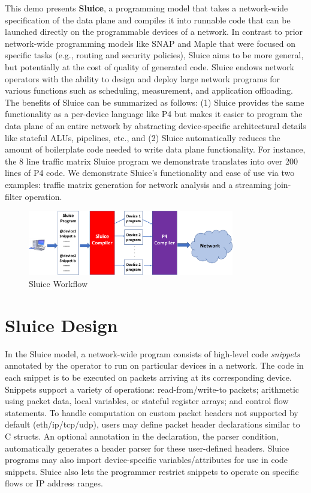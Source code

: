 This demo presents \textbf{Sluice}, a programming model that takes a
network-wide specification of the data plane and compiles it into runnable code
that can be launched directly on the programmable devices of a network. In
contrast to prior network-wide programming models like SNAP and Maple that were
focused on specific tasks (e.g., routing and security policies), Sluice aims to
be more general, but potentially at the cost of quality of generated code.
Sluice endows network operators with the ability to design and deploy large
network programs for various functions such as scheduling, measurement, and
application offloading.  The benefits of Sluice can be summarized as follows: (1) Sluice provides the same functionality as a per-device language like P4 but makes it easier to program the data plane of an entire network by abstracting device-specific architectural details like stateful ALUs, pipelines, etc., and (2) Sluice automatically reduces the amount of boilerplate code needed to write data plane functionality. For instance, the 8 line traffic matrix Sluice program we demonstrate translates into over 200 lines of P4 code. We demonstrate Sluice's functionality and ease of use via two examples: traffic matrix generation for network analysis and a streaming join-filter operation.
\begin{figure}[tp]
\centering
\includegraphics[width=90mm,scale=0.7]{figures/sluice_workflow.pdf}
\caption{Sluice Workflow}
\vspace{-7mm}
\end{figure}
\vspace{-3mm}

\section{Sluice Design}
In the Sluice model, a network-wide program consists of high-level code
\textit{snippets} annotated by the operator to run on particular devices in a
network. The code in each snippet is to be executed on packets arriving at its
corresponding device. Snippets support a variety of operations:
read-from/write-to packets; arithmetic using packet data, local variables, or
stateful register arrays; and control flow statements. To handle computation on
custom packet headers not supported by default (eth/ip/tcp/udp), users may
define packet header declarations similar to C structs. An optional annotation
in the declaration, the parser condition, automatically generates a header
parser for these user-defined headers. Sluice programs may also import
device-specific variables/attributes for use in code snippets. Sluice also lets
the programmer restrict snippets to operate on specific flows or IP address
ranges.

